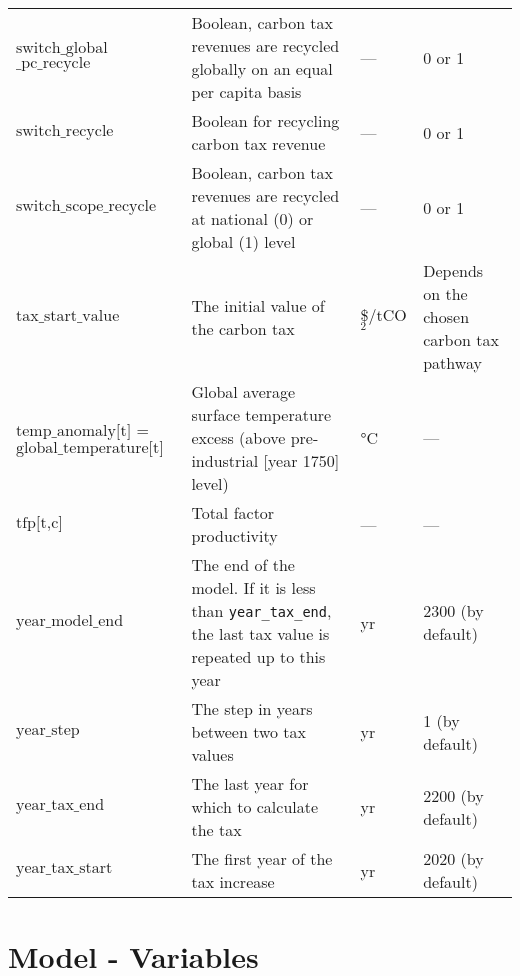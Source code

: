 \documentclass[
]{article}
\begin{document}
\begin{longtable}{|p{1.5in}|p{2.5in}|p{0.9in}|p{0.7in}|}
  \(\text{switch\_global}\) \(\text{\_pc\_recycle}\) & Boolean, carbon tax revenues are recycled globally on an equal per capita basis & — & 0 or 1 \\
  \(\text{switch\_recycle}\) & Boolean for recycling carbon tax revenue & — & 0 or 1 \\
  \(\text{switch\_scope\_recycle}\) & Boolean, carbon tax revenues are recycled at national (0) or global (1) level & — & 0 or 1 \\
  \(\text{tax\_start\_value}\) & The initial value of the carbon tax & \$/tCO$_2$ & Depends on the chosen carbon tax pathway \\
  \(\text{temp\_anomaly[t]}\) = \(\text{global\_temperature[t]}\) & Global average surface temperature excess (above pre-industrial {[}year 1750{]} level) & °C & — \\
  \(\text{tfp[t,c]}\) & Total factor productivity & — & — \\
  \(\text{year\_model\_end}\) & The end of the model. If it is less than \texttt{year\_tax\_end}, the last tax value is repeated up to this year & yr & 2300 (by default) \\
  \(\text{year\_step}\) & The step in years between two tax values & yr & 1 (by default) \\
  \(\text{year\_tax\_end}\) & The last year for which to calculate the tax & yr & 2200 (by default) \\
  \(\text{year\_tax\_start}\) & The first year of the tax increase & yr & 2020 (by default) \\
  \hline
\end{longtable}



\section{Model - Variables}
\end{document}
